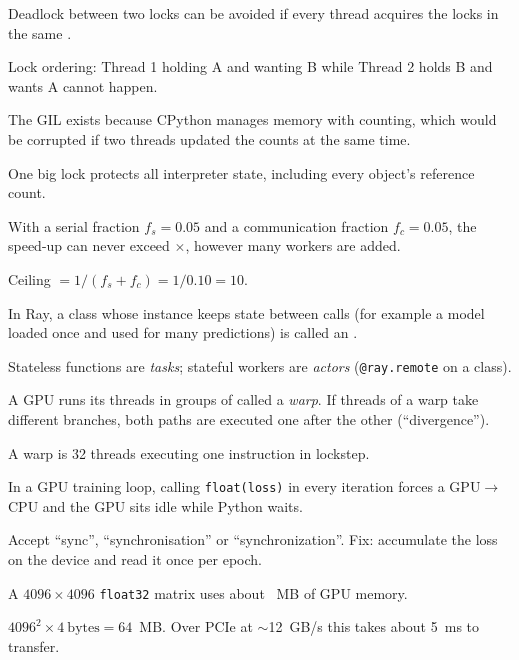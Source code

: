 \documentclass[addpoints,11pt]{exam}
\newcommand{\q}{\Needspace{7\baselineskip}\question}
\newcommand{\blank}[2]{\hspace{0pt}\fillin[#1][#2]\hspace{0pt}}
\begin{document}
\begin{questions}
\q[4]
Deadlock between two locks can be avoided if every thread acquires the locks in the same
\blank{order}{1.2in}.
\begin{solution}Lock ordering: Thread 1 holding A and wanting B while Thread 2 holds B and wants A cannot happen.\end{solution}

\q[4]
The GIL exists because CPython manages memory with \blank{reference}{1.4in} counting, which would
be corrupted if two threads updated the counts at the same time.
\begin{solution}One big lock protects all interpreter state, including every object's reference count.\end{solution}

\q[4]
With a serial fraction $f_s = 0.05$ and a communication fraction $f_c = 0.05$, the speed-up can
never exceed \blank{10}{0.8in}$\times$, however many workers are added.
\begin{solution}Ceiling $=1/(f_s+f_c)=1/0.10=10$.\end{solution}

\q[4]
In Ray, a class whose instance keeps state between calls (for example a model loaded once and used
for many predictions) is called an \blank{actor}{1.2in}.
\begin{solution}Stateless functions are \emph{tasks}; stateful workers are \emph{actors} (\texttt{@ray.remote} on a class).\end{solution}

\q[4]
A GPU runs its threads in groups of \blank{32}{0.8in} called a \emph{warp}. If threads of a warp take
different branches, both paths are executed one after the other (``divergence'').
\begin{solution}A warp is 32 threads executing one instruction in lockstep.\end{solution}

\q[4]
In a GPU training loop, calling \texttt{float(loss)} in every iteration forces a GPU$\to$CPU
\blank{synchronization}{1.3in} and the GPU sits idle while Python waits.
\begin{solution}Accept ``sync'', ``synchronisation'' or ``synchronization''. Fix: accumulate the loss on the device and read it once per epoch.\end{solution}

\q[4]
A $4096\times4096$ \texttt{float32} matrix uses about \blank{64}{0.8in}~MB of GPU memory.
\begin{solution}$4096^2\times 4~\text{bytes}=64$~MB. Over PCIe at $\sim$12~GB/s this takes about 5~ms to transfer.\end{solution}

\end{questions}
\end{document}
